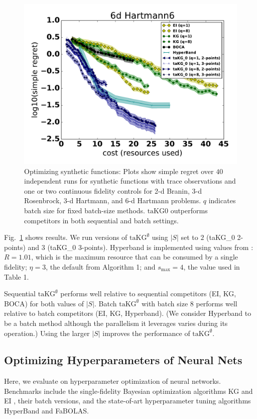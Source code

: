 \documentclass[letterpaper]{article}
\renewcommand{\S}{S}
\newcommand{\taKG}{\text{taKG}}
\newcommand{\taKGE}{\text{taKG}^\emptyset}
\numberwithin{equation}{section}
\begin{document}
\begin{figure}[tb]
   \subfigure
  \centering
  \includegraphics[width=\figwidth, height = \figheight]{fig/Hartmann6.pdf}
\vspace{-8pt}
\caption{\small Optimizing synthetic functions: Plots show simple regret over $40$ independent runs for synthetic functions with trace observations and one or two continuous fidelity controls for 2-d Branin, 3-d Rosenbrock, 3-d Hartmann, and 6-d Hartmann problems.  $q$ indicates batch size for fixed batch-size methods. $\taKG0$ outperforms competitors in both sequential and batch settings.}
\vspace{-12pt}
\label{Fig_syn_taKG}
\end{figure}



Fig.~\ref{Fig_syn_taKG} shows results.  We run versions of $\taKGE$ using $|\S|$ set to $2$ (taKG\_0 2-points) and $3$ (taKG\_0 3-points).
Hyperband is implemented using values from \cite{li2016hyperband}: $R=1.01$, which is the maximum resource that can be consumed by a single fidelity; $\eta=3$, the default from Algorithm 1; and $s_{\max} = 4$, the value used in Table 1.

Sequential $\taKGE$ performs well relative to sequential competitors (EI, KG, BOCA) for both values of $|\S|$.
Batch $\taKGE$ with batch size 8 performs well relative to batch competitors (EI, KG, Hyperband).
(We consider Hyperband to be a batch method although the parallelism it leverages varies during its operation.)
Using the larger $|\S|$ improves the performance of $\taKGE$.

\subsection{Optimizing Hyperparameters of Neural Nets} \label{sect:hyperexp}
Here, we evaluate on hyperparameter optimization of neural networks. Benchmarks include the single-fidelity Bayesian optimization algorithms KG \citep{wu2016parallel} and EI \citep{jones1998efficient}, their batch versions, and the state-of-art hyperparameter tuning algorithms HyperBand and FaBOLAS.  
\end{document}
